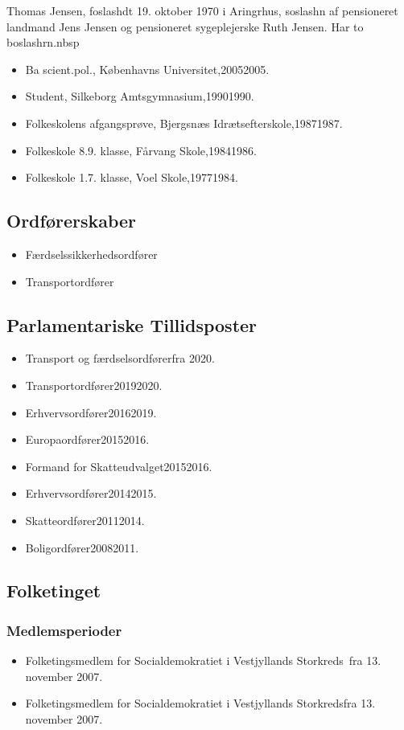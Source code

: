 \documentclass[11pt, a4paper]{awesome-cv}
\begin{document}
\makecvheader[R]
\makelettertitle
\begin{cvletter}
Thomas Jensen, foslashdt 19. oktober 1970 i Aringrhus, soslashn af pensioneret landmand Jens Jensen og pensioneret sygeplejerske Ruth Jensen. Har to boslashrn.nbsp

\begin{itemize}
\item Ba scient.pol., Københavns Universitet,20052005.
\item Student, Silkeborg Amtsgymnasium,19901990.
\item Folkeskolens afgangsprøve, Bjergsnæs Idrætsefterskole,19871987.
\item Folkeskole 8.9. klasse, Fårvang Skole,19841986.
\item Folkeskole 1.7. klasse, Voel Skole,19771984.
\end{itemize}
\subsection*{Ordførerskaber}
\begin{itemize}
\item Færdselssikkerhedsordfører
\item Transportordfører
\end{itemize}
\subsection*{Parlamentariske Tillidsposter}
\begin{itemize}
\item Transport og færdselsordførerfra 2020.
\item Transportordfører20192020.
\item Erhvervsordfører20162019.
\item Europaordfører20152016.
\item Formand for Skatteudvalget20152016.
\item Erhvervsordfører20142015.
\item Skatteordfører20112014.
\item Boligordfører20082011.
\end{itemize}
\subsection*{Folketinget}
\subsubsection*{Medlemsperioder}
\begin{itemize}
\item Folketingsmedlem for Socialdemokratiet i Vestjyllands Storkreds fra 13. november 2007.
\item Folketingsmedlem for Socialdemokratiet i Vestjyllands Storkredsfra 13. november 2007.
\end{itemize}

\end{cvletter}
\end{document}
